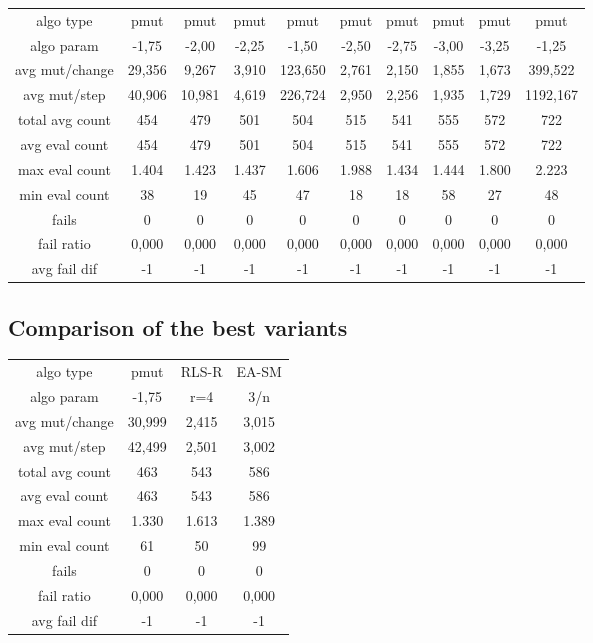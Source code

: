 \begin{tabular}[h]{cccccccccc}
algo type&             pmut&      pmut&      pmut&      pmut&      pmut&      pmut&      pmut&      pmut&      pmut\\
algo param&           -1,75&     -2,00&     -2,25&     -1,50&     -2,50&     -2,75&     -3,00&     -3,25&     -1,25\\
avg mut/change&      29,356&     9,267&     3,910&   123,650&     2,761&     2,150&     1,855&     1,673&   399,522\\
avg mut/step&        40,906&    10,981&     4,619&   226,724&     2,950&     2,256&     1,935&     1,729&  1192,167\\
\hline
total avg count&        454&       479&       501&       504&       515&       541&       555&       572&       722\\
avg eval count&         454&       479&       501&       504&       515&       541&       555&       572&       722\\
max eval count&       1.404&     1.423&     1.437&     1.606&     1.988&     1.434&     1.444&     1.800&     2.223\\
min eval count&          38&        19&        45&        47&        18&        18&        58&        27&        48\\
\hline
fails&                    0&         0&         0&         0&         0&         0&         0&         0&         0\\
fail ratio&           0,000&     0,000&     0,000&     0,000&     0,000&     0,000&     0,000&     0,000&     0,000\\
avg fail dif&            -1&        -1&        -1&        -1&        -1&        -1&        -1&        -1&        -1\\
\end{tabular}


\subsection{Comparison of the best variants}


\begin{tabular}[h]{cccc}
algo type&            pmut&    RLS-R&    EA-SM\\
algo param&          -1,75&      r=4&      3/n\\
avg mut/change&     30,999&    2,415&    3,015\\
avg mut/step&       42,499&    2,501&    3,002\\
\hline
total avg count&       463&      543&      586\\
avg eval count&        463&      543&      586\\
max eval count&      1.330&    1.613&    1.389\\
min eval count&         61&       50&       99\\
\hline
fails&                   0&        0&        0\\
fail ratio&          0,000&    0,000&    0,000\\
avg fail dif&           -1&       -1&       -1\\
\end{tabular}

